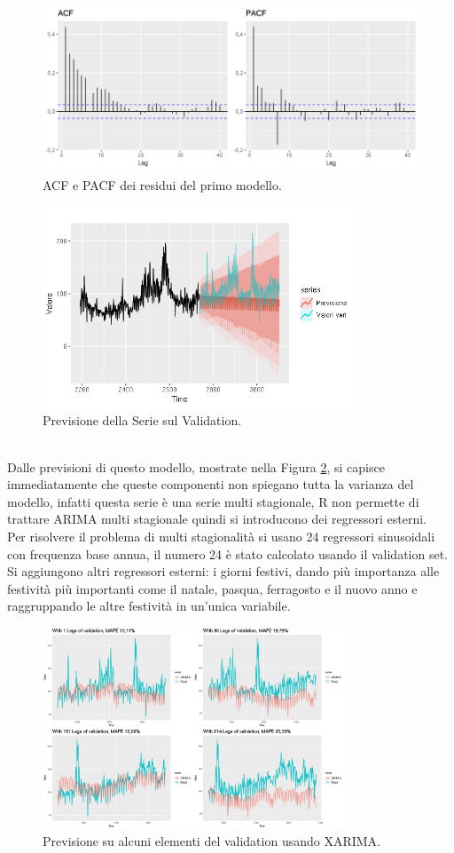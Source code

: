 \documentclass[12pt, onecolumn]{article}
\begin{document}
\begin{figure}[!h]
  \centering
  \includegraphics[width=\linewidth,height=5cm]{imgs/ACF_2.png}
  \caption{ACF e PACF dei residui del primo modello.}
  \label{fig:ACF_2}
\end{figure}
\begin{figure}[!h]
  \centering
  \includegraphics[width=\linewidth,height=6cm]{imgs/forecast_ar_1.png}
  \caption{Previsione della Serie sul Validation.}
  \label{fig:ARIMA_pred}
\end{figure}\\
Dalle previsioni di questo modello, mostrate nella Figura \ref{fig:ARIMA_pred}, si capisce immediatamente che queste componenti non spiegano tutta la varianza del modello, infatti questa serie è una serie multi stagionale, R non permette di trattare ARIMA multi stagionale quindi si introducono dei regressori esterni.\\
Per risolvere il problema di multi stagionalità si usano 24 regressori sinusoidali con frequenza base annua, il numero 24 è stato calcolato usando il validation set.
Si aggiungono altri regressori esterni: i giorni festivi, dando più importanza alle festività più importanti come il natale, pasqua, ferragosto e il nuovo anno e raggruppando le altre festività in un'unica variabile.
\begin{figure}[!h]
  \centering
  \includegraphics[width=\linewidth,height=6cm]{imgs/forecast_arima.png}
  \caption{Previsione su alcuni elementi del validation usando XARIMA.}
  \label{fig:XARIMA_pred}
\end{figure}\\
\end{document}

